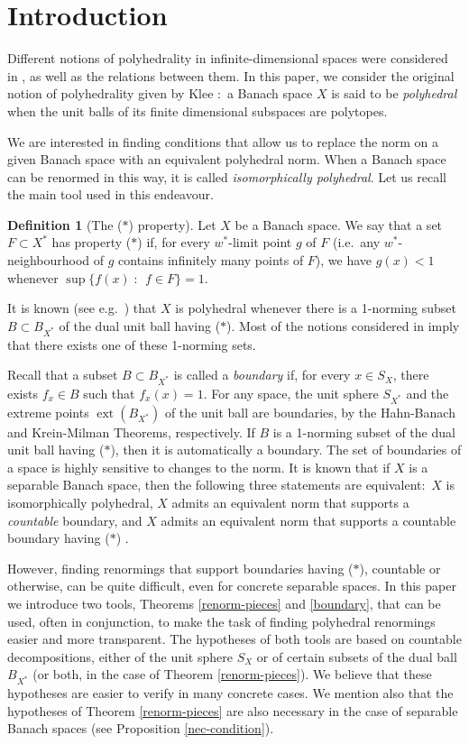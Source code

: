 \documentclass[12pt,a4paper]{amsart}
\theoremstyle{definition}
\newtheorem{definition}[theorem]{Definition}
\theoremstyle{remark}
\DeclareMathOperator{\ext}{ext}
\newcommand{\set}[2]{\{{#1} \;:\;\, {#2}\}}
\newcommand{\st}{($*$)}
\begin{document}
\section{Introduction}

Different notions of polyhedrality in infinite-dimensional spaces
were considered in \cite{FV}, as well as the relations between them.
In this paper, we consider the original notion of polyhedrality given
by Klee \cite{Klee}:\ a Banach space $X$ is said to be {\em polyhedral}
when the unit balls of its finite dimensional subspaces are polytopes.

We are interested in finding conditions that allow us to replace the
norm on a given Banach space with an equivalent polyhedral norm. When
a Banach space can be renormed in this way, it is called {\em isomorphically
polyhedral}. Let us recall the main tool used in this endeavour.

\begin{definition}[The {\st} property]
Let $X$ be a Banach space. We say that a set $F\subset X^*$ has
property {\st}  if, for every $w^*$-limit point $g$ of $F$ (i.e.\
any $w^*$-neighbourhood of $g$ contains infinitely many points of
$F$), we have $g(x) < 1$ whenever $\sup\set{f(x)}{f\in F}=1$.
\end{definition}

It is known (see e.g.\ \cite[Proposition 6.11]{FLP}) that $X$ is
polyhedral whenever there is a 1-norming subset $B\subset
B_{X^*}$ of the dual unit ball having {\st}. Most of the notions
considered in \cite{FV} imply that there exists one of these 1-norming
sets.

Recall that a subset $B\subset B_{X^*}$ is called a {\em boundary}
if, for every $x \in S_X$, there exists $f_x\in B$ such that $f_x(x) = 1$.
For any space, the unit sphere $S_{X^*}$ and the extreme points $\ext(B_{X^*})$ of
the unit ball are boundaries, by the Hahn-Banach and Krein-Milman Theorems,
respectively. If $B$ is a 1-norming subset of the dual unit ball having {\st},
then it is automatically a boundary. The set of boundaries of a space is
highly sensitive to changes to the norm. It is known that if $X$ is a separable
Banach space, then the following three statements are equivalent:\ $X$ is isomorphically polyhedral,
$X$ admits an equivalent norm that supports a {\em countable} boundary, and
$X$ admits an equivalent norm that supports a countable boundary having {\st} \cite{fonf2}.

However, finding renormings that support boundaries having {\st}, countable
or otherwise, can be quite difficult, even for concrete separable spaces.
In this paper we introduce two tools, Theorems \ref{renorm-pieces} and \ref{boundary},
that can be used, often in conjunction, to make the task of finding polyhedral
renormings easier and more transparent. The
hypotheses of both tools are based on countable decompositions,
either of the unit sphere $S_X$ or of certain subsets of the dual ball
$B_{X^*}$ (or both, in the case of Theorem \ref{renorm-pieces}). We believe
that these hypotheses are easier to verify in many concrete cases. We mention also
that the hypotheses of Theorem \ref{renorm-pieces} are also necessary
in the case of separable Banach spaces (see Proposition \ref{nec-condition}).
\end{document}
